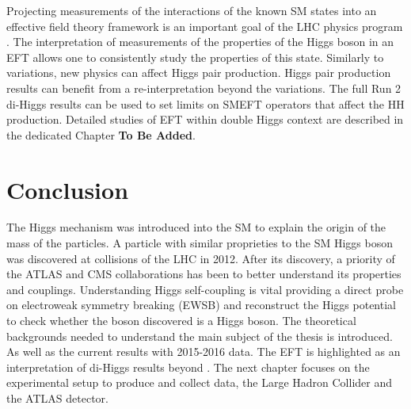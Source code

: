 Projecting measurements of the interactions of the known SM states into an effective field theory framework is an important goal of the LHC physics program \cite{LHC_EFT}. The interpretation of measurements of the properties of the Higgs boson in an
EFT allows one to consistently study the properties of this state. Similarly to \kl variations, new physics can affect Higgs pair production. Higgs pair production results can benefit from a re-interpretation beyond the \kl variations. The full Run 2 di-Higgs results can be used to set limits on SMEFT operators that affect the HH production. Detailed studies of EFT within double Higgs context are described in the dedicated Chapter \textbf{To Be Added}.

\section{Conclusion}
\label{chap1:Conc}
The Higgs mechanism was introduced into the SM to explain the origin of the mass of the particles. A particle with similar proprieties to the SM Higgs boson was discovered at collisions of the LHC in 2012. After its discovery, a priority of the ATLAS and CMS collaborations has been to better understand its properties and couplings. Understanding Higgs self-coupling is vital providing a direct probe on electroweak symmetry breaking (EWSB) and reconstruct the Higgs potential to check whether the boson discovered is a Higgs boson. The theoretical backgrounds needed to understand the main subject of the thesis is introduced. As well as the current results with 2015-2016 data. The EFT is highlighted as an interpretation of di-Higgs results beyond \kl. The next chapter focuses on the experimental setup to produce and collect data, the Large Hadron Collider and the ATLAS detector. 

